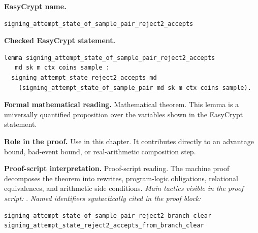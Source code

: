 \begin{formaltheorem}
\noindent\textbf{EasyCrypt name.}
\begin{lstlisting}[language=EasyCrypt,basicstyle=\ttfamily\scriptsize]
signing_attempt_state_of_sample_pair_reject2_accepts
\end{lstlisting}
\noindent\textbf{Checked EasyCrypt statement.}
\begin{lstlisting}[language=EasyCrypt,basicstyle=\ttfamily\scriptsize]
lemma signing_attempt_state_of_sample_pair_reject2_accepts
   md sk m ctx coins sample :
  signing_attempt_state_reject2_accepts md
    (signing_attempt_state_of_sample_pair md sk m ctx coins sample).
\end{lstlisting}
\noindent\textbf{Formal mathematical reading.}
Mathematical theorem. This lemma is a universally quantified proposition over the variables shown in the EasyCrypt statement.

\noindent\textbf{Role in the proof.}
Use in this chapter. It contributes directly to an advantage bound, bad-event bound, or real-arithmetic composition step.

\noindent\textbf{Proof-script interpretation.}
Proof-script reading. The machine proof decomposes the theorem into rewrites, program-logic obligations, relational equivalences, and arithmetic side conditions.
\emph{Main tactics visible in the proof script:} .
\emph{Named identifiers syntactically cited in the proof block:}
\begin{lstlisting}[language=EasyCrypt,basicstyle=\ttfamily\scriptsize]
signing_attempt_state_of_sample_pair_reject2_branch_clear
signing_attempt_state_reject2_accepts_from_branch_clear
\end{lstlisting}

\end{formaltheorem}

